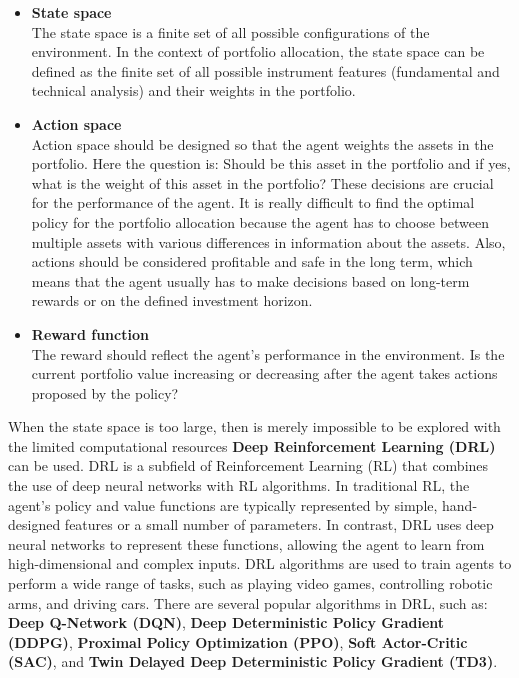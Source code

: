 \documentclass[../xlapes02]{subfiles}
\begin{document}
\begin{itemize}
    \item \textbf{State space}\\
    The state space is a finite set of all possible configurations of the environment.
    In the context of portfolio allocation, the state space can be defined as the finite set of all possible instrument features (fundamental and technical analysis) and their weights in the portfolio.
    \item \textbf{Action space} \\
    Action space should be designed so that the agent weights the assets in the portfolio.
    Here the question is: Should be this asset in the portfolio and if yes, what is the weight of this asset in the portfolio?
    These decisions are crucial for the performance of the agent.
    It is really difficult to find the optimal policy for the portfolio allocation because the agent has to choose between multiple assets with various differences in information about the assets.
    Also, actions should be considered profitable and safe in the long term, which means that the agent usually has to make decisions based on long-term rewards or on the defined investment horizon.
    \item \textbf{Reward function}\\
    The reward should reflect the agent's performance in the environment.
    Is the current portfolio value increasing or decreasing after the agent takes actions proposed by the policy?
\end{itemize}

When the state space is too large, then is merely impossible to be explored with the limited computational resources \textbf{Deep Reinforcement Learning (DRL)} can be used.
DRL is a subfield of Reinforcement Learning (RL) that combines the use of deep neural networks with RL algorithms.
In traditional RL, the agent's policy and value functions are typically represented by simple, hand-designed features or a small number of parameters.
In contrast, DRL uses deep neural networks to represent these functions, allowing the agent to learn from high-dimensional and complex inputs.
DRL algorithms are used to train agents to perform a wide range of tasks, such as playing video games, controlling robotic arms, and driving cars.
There are several popular algorithms in DRL, such as:
\textbf{Deep Q-Network (DQN)},
\textbf{Deep Deterministic Policy Gradient (DDPG)},
\textbf{Proximal Policy Optimization (PPO)},
\textbf{Soft Actor-Critic (SAC)},
and \textbf{Twin Delayed Deep Deterministic Policy Gradient (TD3)}.
\end{document}
